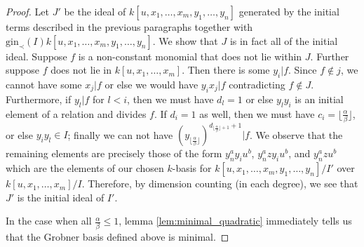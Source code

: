 \documentclass{amsart}
\theoremstyle{plain}
\theoremstyle{definition}
\theoremstyle{remark}
\numberwithin{equation}{section}
\newcommand \gin{\text{gin}}
\begin{document}
\begin{proof}
Let $J'$ be the ideal of $k[u, x_1, \ldots, x_m, y_1, \ldots, y_n]$ generated by the initial 
terms described in the previous paragraphs together with $\gin_\prec(I)k[u, x_1, \ldots, 
x_m, y_1, \ldots, y_n]$.  We show that $J$ is in fact all of the initial ideal.  Suppose $f$ is a 
non-constant monomial that does not lie within $J$.  Further suppose $f$ does not lie in 
$k[u, x_1, \ldots, x_m]$.  Then there is some $y_i|f$.  Since $f\not\in j$, we cannot have 
some $x_j|f$ or else we would have $y_ix_j|f$ contradicting $f\not\in J$.  Furthermore, if 
$y_l|f$ for $l<i$, then we must have $d_l=1$ or else $y_ly_i$ is an initial element of a 
relation and divides $f$.  If $d_i=1$ as well, then we must have $c_i=\lfloor \frac{\alpha}
{\beta}\rfloor$, or else $y_iy_l\in I$; finally we can not have $(y_{\lfloor \frac{\alpha}{\beta}
\rfloor})^{d_{\lfloor \frac{\alpha}{\beta} \rfloor+1}+1}|f$.  We observe that the remaining 
elements are precisely those of the form $y_n^a y_i u^b$, $y_n^a zy_iu^b$, and $y_n^a z 
u^b$ which are the elements of our chosen $k$-basis for $k[u, x_1, \ldots, x_m, y_1, \ldots, 
y_n]/I'$ over $k[u, x_1, \ldots, x_m]/I$.  Therefore, by dimension counting (in each degree), 
we see that $J'$ is the initial ideal of $I'$.

In the case when all $\frac{\alpha}{\beta}\le 1$, lemma \ref{lem:minimal_quadratic} immediately tells us that the Grobner basis defined above is minimal.
\end{proof}
\end{document}
